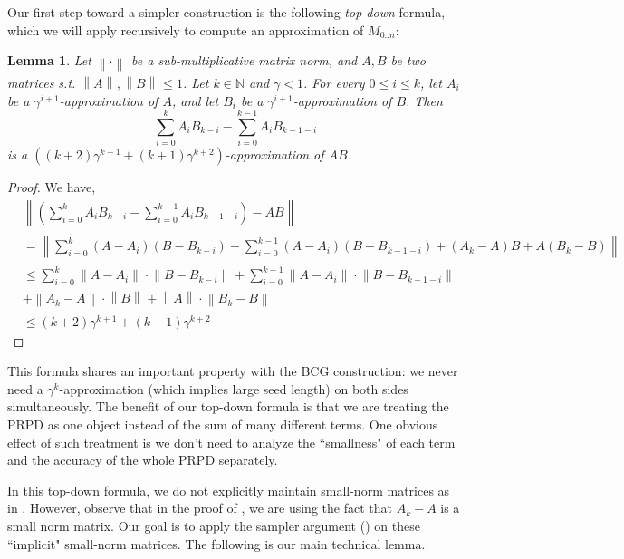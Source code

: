 \documentclass[10pt,a4paper]{article}
\newtheorem{lemma}[theorem]{Lemma}
\newcommand{\norm}[2][]{\left\|#2\right\|_{#1}}
\newcommand{\bbN}{\mathbb N}
\begin{document}
Our first step toward a simpler construction is the following \emph{top-down} formula, which we will apply recursively to compute an approximation of $M_{0..n}$:
\begin{lemma}\label{lemma:main}
Let $\norm{\cdot}$ be a sub-multiplicative matrix norm, and $A,B$ be two matrices s.t. $\norm{A},\norm{B}\le 1$. Let $k\in\bbN$ and $\gamma<1$. For every $0\le i\le k$, let $A_i$ be a $\gamma^{i+1}$-approximation of $A$, and let $B_i$ be a $\gamma^{i+1}$-approximation of $B$. Then $$\sum_{i=0}^k A_{i}B_{k-i}-\sum_{i=0}^{k-1} A_{i}B_{k-1-i}$$ is a $((k+2)\gamma^{k+1}+(k+1)\gamma^{k+2})$-approximation of $AB$.
\end{lemma}
\begin{proof}
We have,
\begin{align*}
&\norm{ (\sum_{i=0}^k A_{i}B_{k-i}-\sum_{i=0}^{k-1} A_{i}B_{k-1-i})-AB}\\
 &= \norm{ \sum_{i=0}^k (A-A_{i})(B-B_{k-i})-\sum_{i=0}^{k-1} (A-A_{i})(B-B_{k-1-i})+(A_k-A)B+A(B_k-B)}\\
 &\le \sum_{i=0}^k \norm{A-A_i}\cdot\norm{B-B_{k-i}}+\sum_{i=0}^{k-1}\norm{A-A_{i}}\cdot\norm{B-B_{k-1-i}}\\
 &+\norm{A_k-A}\cdot\norm{B}+\norm{A}\cdot\norm{B_k-B}\\
 &\le(k+2)\gamma^{k+1}+(k+1)\gamma^{k+2}
\end{align*}
\end{proof}
This formula shares an important property with the BCG construction: we never need a $\gamma^k$-approximation (which implies large seed length) on both sides simultaneously. The benefit of our top-down formula is that we are treating the PRPD as one object instead of the sum of many different terms. One obvious effect of such treatment is we don't need to analyze the ``smallness" of each term and the accuracy of the whole PRPD separately. 

In this top-down formula, we do not explicitly maintain small-norm matrices as in \cite{BCG18}. However, observe that in the proof of , we are using the fact that $A_k-A$ is a small norm matrix. Our goal is to apply the sampler argument () on these ``implicit" small-norm matrices. The following is our main technical lemma.
\end{document}
